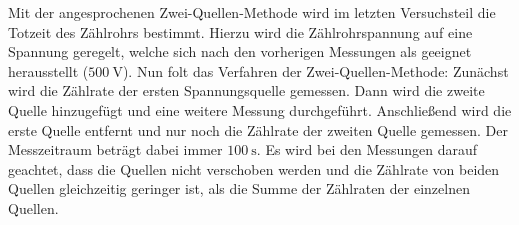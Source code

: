 Mit der angesprochenen Zwei-Quellen-Methode wird im letzten Versuchsteil die Totzeit
des Zählrohrs bestimmt. Hierzu wird die Zählrohrspannung auf eine Spannung geregelt, 
welche sich nach den vorherigen Messungen als geeignet herausstellt ($\SI{500}{\volt}$).
Nun folt das Verfahren der Zwei-Quellen-Methode: Zunächst wird die Zählrate der ersten
Spannungsquelle gemessen. Dann wird die zweite Quelle hinzugefügt und eine weitere 
Messung durchgeführt. Anschließend wird die erste Quelle entfernt und nur noch die 
Zählrate der zweiten Quelle gemessen. Der Messzeitraum beträgt dabei immer $\SI{100}{\second}$.
Es wird bei den Messungen darauf geachtet, dass die Quellen nicht verschoben 
werden und die Zählrate von beiden Quellen gleichzeitig geringer ist, als die Summe 
der Zählraten der einzelnen Quellen. \\